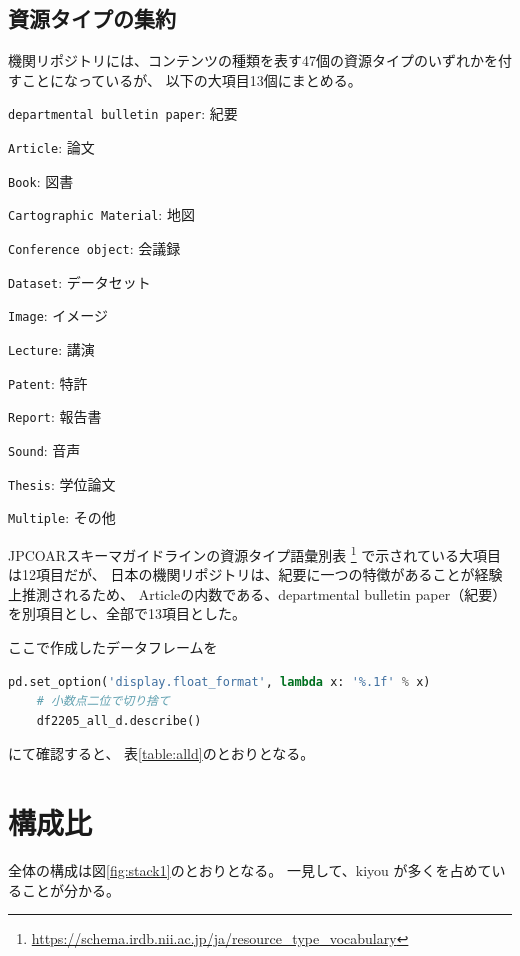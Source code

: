 \documentclass[submit,noauthor]{ono}
\def\|{\verb|}
\begin{document}
%2.1
\subsection{資源タイプの集約}
機関リポジトリには、コンテンツの種類を表す47個の資源タイプのいずれかを付すことになっているが、
以下の大項目13個にまとめる。

\begin{Enumerate}
	\item \|departmental bulletin paper|: 紀要
	\item \|Article|: 論文
	\item \|Book|: 図書
	\item \|Cartographic Material|: 地図
	\item \|Conference object|: 会議録
	\item \|Dataset|: データセット
	\item \|Image|: イメージ
	\item \|Lecture|: 講演
	\item \|Patent|: 特許
	\item \|Report|: 報告書
	\item \|Sound|: 音声
	\item \|Thesis|: 学位論文
	\item \|Multiple|: その他
\end{Enumerate}%

JPCOARスキーマガイドラインの資源タイプ語彙別表
\footnote{\url{https://schema.irdb.nii.ac.jp/ja/resource_type_vocabulary}}
で示されている大項目は12項目だが、
日本の機関リポジトリは、紀要に一つの特徴があることが経験上推測されるため、
Articleの内数である、departmental bulletin paper（紀要）を別項目とし、全部で13項目とした。

ここで作成したデータフレームを

\begin{lstlisting}[language=Python,breaklines]
	pd.set_option('display.float_format', lambda x: '%.1f' % x)
	# 小数点二位で切り捨て
	df2205_all_d.describe()
\end{lstlisting}

にて確認すると、
表\ref{table:alld}のとおりとなる。

\section{構成比}
全体の構成は図\ref{fig:stack1}のとおりとなる。
一見して、kiyou が多くを占めていることが分かる。
\end{document}

